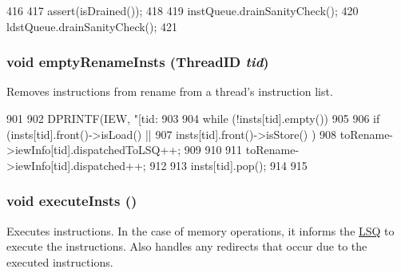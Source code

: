 \begin{DoxyCode}
416 {
417     assert(isDrained());
418 
419     instQueue.drainSanityCheck();
420     ldstQueue.drainSanityCheck();
421 }
\end{DoxyCode}
\hypertarget{classDefaultIEW_a1fe94223811c326eed5cc0664d85c5fd}{
\subsubsection[{emptyRenameInsts}]{\setlength{\rightskip}{0pt plus 5cm}void emptyRenameInsts ({\bf ThreadID} {\em tid})}}
\label{classDefaultIEW_a1fe94223811c326eed5cc0664d85c5fd}
Removes instructions from rename from a thread's instruction list. 


\begin{DoxyCode}
901 {
902     DPRINTF(IEW, "[tid:%
903 
904     while (!insts[tid].empty()) {
905 
906         if (insts[tid].front()->isLoad() ||
907             insts[tid].front()->isStore() ) {
908             toRename->iewInfo[tid].dispatchedToLSQ++;
909         }
910 
911         toRename->iewInfo[tid].dispatched++;
912 
913         insts[tid].pop();
914     }
915 }
\end{DoxyCode}
\hypertarget{classDefaultIEW_a2d00e30d66a56e4667e28df302c98ac0}{
\subsubsection[{executeInsts}]{\setlength{\rightskip}{0pt plus 5cm}void executeInsts ()}}
\label{classDefaultIEW_a2d00e30d66a56e4667e28df302c98ac0}
Executes instructions. In the case of memory operations, it informs the \hyperlink{classLSQ}{LSQ} to execute the instructions. Also handles any redirects that occur due to the executed instructions. 


